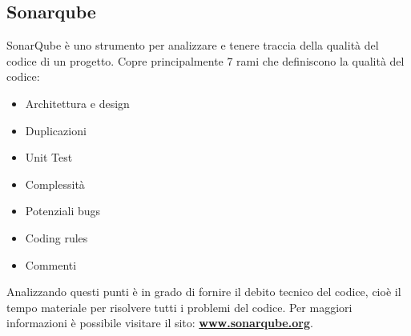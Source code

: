 \subsection{Sonarqube}
SonarQube è uno strumento per analizzare e tenere traccia della qualità del codice di un progetto. Copre principalmente 7 rami che definiscono la qualità del codice:
\begin{itemize}
    \item Architettura e design
    \item Duplicazioni
    \item Unit Test
    \item Complessità
    \item Potenziali bugs
    \item Coding rules
    \item Commenti
\end{itemize}
Analizzando questi punti è in grado di fornire il debito tecnico del codice, cioè il tempo materiale per risolvere tutti i problemi del codice. Per maggiori informazioni è possibile visitare il sito: \textbf{\href{https://www.sonarqube.org/}{www.sonarqube.org}}.